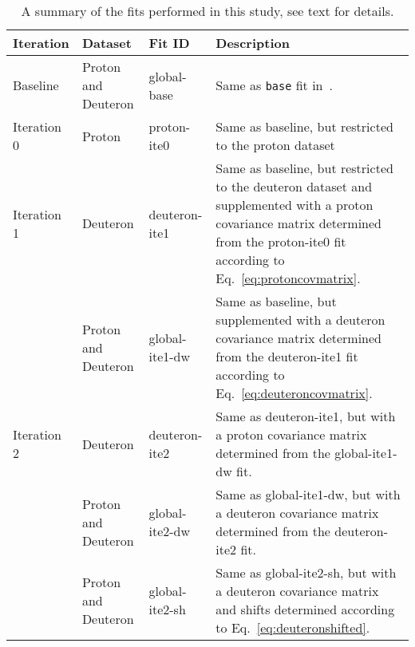 \begin{table}[h]
  \centering
  \scriptsize
  \renewcommand{\arraystretch}{1.13}
  \begin{tabularx}{\textwidth}{lllX}
    \toprule
    {\bf Iteration }  & {\bf Dataset }            & {\bf Fit ID }        & { \bf Description }\\
    \midrule
    Baseline    & Proton and Deuteron & global-base    & Same as {\tt base} fit in~\cite{Faura:2020oom}.\\
    \midrule
    Iteration 0 & Proton              & proton-ite0    & Same as baseline, but restricted to the proton dataset\\
    \midrule
    Iteration 1 & Deuteron            & deuteron-ite1  & Same as baseline, but restricted to the deuteron dataset
                                                         and supplemented with a proton covariance matrix determined
                                                         from the proton-ite0 fit according to
                                                         Eq.~\eqref{eq:protoncovmatrix}.\\
                & Proton and Deuteron & global-ite1-dw & Same as baseline, but supplemented with a deuteron covariance
                                                         matrix determined from the deuteron-ite1 fit according to
                                                         Eq.~\eqref{eq:deuteroncovmatrix}.\\
    \midrule
    Iteration 2 & Deuteron            & deuteron-ite2  & Same as deuteron-ite1, but with a proton covariance matrix
                                                         determined from the global-ite1-dw fit.\\
                & Proton and Deuteron & global-ite2-dw & Same as global-ite1-dw, but with a deuteron covariance matrix
                                                         determined from the deuteron-ite2 fit.\\
                & Proton and Deuteron & global-ite2-sh & Same as global-ite2-sh, but with a deuteron covariance matrix
                                                         and shifts determined according to
                                                         Eq.~\eqref{eq:deuteronshifted}.\\
    \bottomrule
  \end{tabularx}
  \caption{A summary of the fits performed in this study, see text for details.}
  \label{tab:fits}
\end{table}
